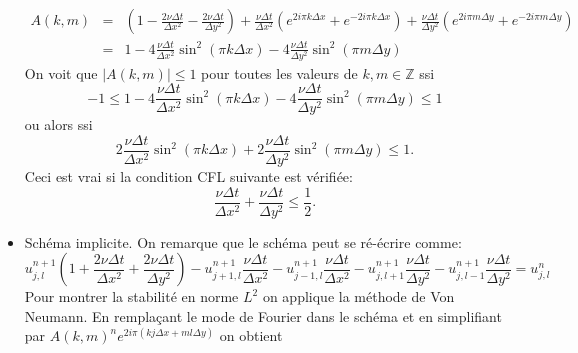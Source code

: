 \documentclass[12pt,a4paper]{article}
\begin{document}
\begin{itemize}
$$
\begin{array}{rcl}
A(k,m) &=& \displaystyle \left(1-\frac{2\nu\Delta t}{\Delta x^2}  - \frac{2\nu\Delta t}{\Delta y^2} \right) + \frac{\nu\Delta t}{\Delta x^2} (e^{2i\pi k \Delta x}+e^{-2i\pi k\Delta x})+\frac{\nu\Delta t}{\Delta y^2} (e^{2i\pi m\Delta y}+e^{-2i\pi m\Delta y})\\
&=&\displaystyle 1 - 4 \frac{\nu\Delta t}{\Delta x^2} \sin^2(\pi k\Delta x) - 4 \frac{\nu\Delta t}{\Delta y^2} \sin^2(\pi m\Delta y) 
\end{array}
$$
On voit que $|A(k,m)| \le 1$ pour toutes les valeurs de $k,m \in \mathbb{Z}$ ssi 
$$
-1 \le 1 - 4 \frac{\nu\Delta t}{\Delta x^2} \sin^2(\pi k\Delta x) - 4 \frac{\nu\Delta t}{\Delta y^2} \sin^2(\pi m\Delta y)  \le 1
$$
ou alors ssi 
$$
2 \frac{\nu\Delta t}{\Delta x^2} \sin^2(\pi k\Delta x) +2  \frac{\nu\Delta t}{\Delta y^2} \sin^2(\pi m\Delta y) \le 1. 
$$
Ceci est vrai si la condition CFL suivante est vérifiée:
$$
\frac{\nu\Delta t}{\Delta x^2} +\frac{\nu\Delta t}{\Delta y^2} \le \frac{1}{2}.
$$
\item Schéma implicite. On remarque que le schéma peut se ré-écrire comme:
$$
u_{j,l}^{n+1} \left(1+\frac{2\nu\Delta t}{\Delta x^2}  + \frac{2\nu\Delta t}{\Delta y^2} \right) -u_{j+1,l}^{n+1}\frac{\nu\Delta t}{\Delta x^2}  - u_{j-1,l}^{n+1}\frac{\nu\Delta t}{\Delta x^2}-u_{j,l+1}^{n+1}\frac{\nu\Delta t}{\Delta y^2}  - u_{j,l-1}^{n+1}\frac{\nu\Delta t}{\Delta y^2} = u_{j,l}^n
$$
Pour montrer la stabilité en norme $L^2$ on applique la méthode de Von Neumann. En remplaçant le mode de Fourier dans le schéma et en simplifiant par $A(k,m)^ne^{2i\pi(kj\Delta x +ml\Delta y)}$ on obtient


\end{itemize}
\end{document}
